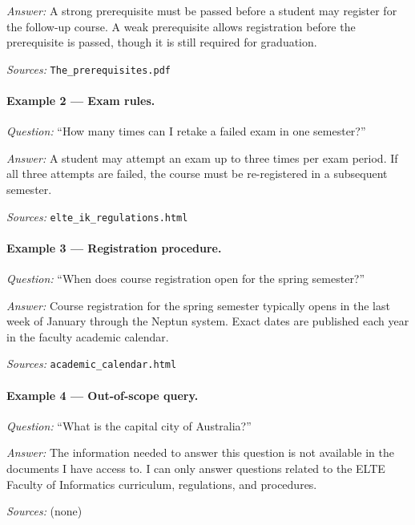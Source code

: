 \textit{Answer:} A strong prerequisite must be passed before a student may register
for the follow-up course. A weak prerequisite allows registration before the
prerequisite is passed, though it is still required for graduation.

\textit{Sources:} \texttt{The\_prerequisites.pdf}

\paragraph{Example 2 — Exam rules.}
\textit{Question:} ``How many times can I retake a failed exam in one semester?''

\textit{Answer:} A student may attempt an exam up to three times per exam period.
If all three attempts are failed, the course must be re-registered in a subsequent
semester.

\textit{Sources:} \texttt{elte\_ik\_regulations.html}

\paragraph{Example 3 — Registration procedure.}
\textit{Question:} ``When does course registration open for the spring semester?''

\textit{Answer:} Course registration for the spring semester typically opens in the
last week of January through the Neptun system. Exact dates are published each year
in the faculty academic calendar.

\textit{Sources:} \texttt{academic\_calendar.html}

\paragraph{Example 4 — Out-of-scope query.}
\textit{Question:} ``What is the capital city of Australia?''

\textit{Answer:} The information needed to answer this question is not available in
the documents I have access to. I can only answer questions related to the ELTE
Faculty of Informatics curriculum, regulations, and procedures.

\textit{Sources:} (none)
